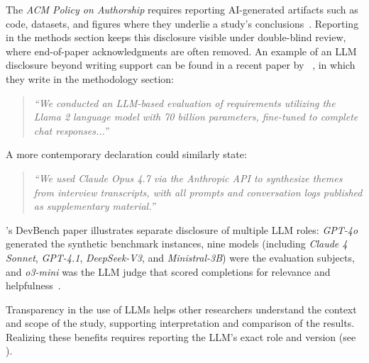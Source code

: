 
The \emph{ACM Policy on Authorship} requires reporting AI-generated artifacts such as code, datasets, and figures where they underlie a study's conclusions~\cite{ACM2026}.
Reporting in the methods section keeps this disclosure visible under double-blind review, where end-of-paper acknowledgments are often removed.
An example of an LLM disclosure beyond writing support can be found in a recent paper by \citeauthor{DBLP:conf/re/LubosFTGMEL24}~\cite{DBLP:conf/re/LubosFTGMEL24}, in which they write in the methodology section:

\begin{quote}
\it
``We conducted an LLM-based evaluation of requirements utilizing the Llama 2 language model with 70 billion parameters, fine-tuned to complete chat responses...''
\end{quote}

\noindent A more contemporary declaration could similarly state:

\begin{quote}
\it
``We used Claude Opus 4.7 via the Anthropic API to synthesize themes from interview transcripts, with all prompts and conversation logs published as supplementary material.''
\end{quote}

\citeauthor{DBLP:journals/corr/abs-2601-11895}'s DevBench paper illustrates separate disclosure of multiple LLM roles: \emph{GPT-4o} generated the synthetic benchmark instances, nine models (including \emph{Claude 4 Sonnet}, \emph{GPT-4.1}, \emph{DeepSeek-V3}, and \emph{Ministral-3B}) were the evaluation subjects, and \emph{o3-mini} was the LLM judge that scored completions for relevance and helpfulness~\cite{DBLP:journals/corr/abs-2601-11895}.


Transparency in the use of LLMs helps other researchers understand the context and scope of the study, supporting interpretation and comparison of the results.
Realizing these benefits requires reporting the LLM's exact role and version (see \modelversion).

